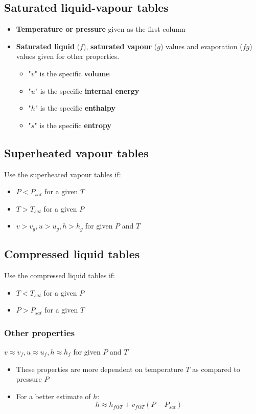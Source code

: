 \documentclass[11pt]{article}
\begin{document}
\subsection{Saturated liquid-vapour tables}
\label{sec:org7d03867}
\begin{itemize}
\item \textbf{Temperature or pressure} given as the first column
\item \textbf{Saturated liquid} (\(f\)), \textbf{saturated vapour} (\(g\)) values and evaporation (\(fg\)) values given for other properties.
\begin{itemize}
\item "\(v\)" is the specific \textbf{volume}
\item "\(u\)" is the specific \textbf{internal energy}
\item "\(h\)" is the specific \textbf{enthalpy}
\item "\(s\)" is the specific \textbf{entropy}
\end{itemize}
\end{itemize}

\subsection{Superheated vapour tables}
\label{sec:org35a6d0a}
Use the superheated vapour tables if:
\begin{itemize}
\item \(P < P_{sat}\) for a given \(T\)
\item \(T > T_{sat}\) for a given \(P\)
\item \(v > v_g, u > u_g, h > h_g\) for given \(P\) and \(T\)
\end{itemize}

\subsection{Compressed liquid tables}
\label{sec:orgd918ee3}
Use the compressed liquid tables if:
\begin{itemize}
\item \(T < T_{sat}\) for a given \(P\)
\item \(P > P_{sat}\) for a given \(T\)
\end{itemize}

\subsubsection{Other properties}
\label{sec:org95bdbaa}
\(v \approx v_f, u \approx u_f, h \approx h_f\) for given \(P\) and \(T\)
\begin{itemize}
\item These properties are more dependent on temperature \(T\) as compared to pressure \(P\)
\item For a better estimate of \(h\):
\[h \approx h_{f@T} + v_{f@T} (P - P_{sat})\]
\end{itemize}
\end{document}
